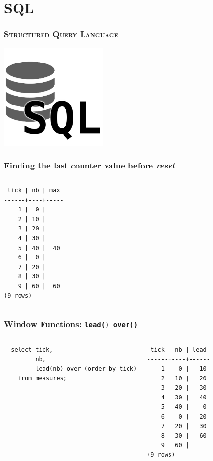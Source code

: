 \documentclass{beamer}
\begin{document}
\section{SQL}

\begin{frame}
  \frametitle{\textsc{Structured Query Language}}

  \begin{center}
    \includegraphics[height=2.1in]{sql.png}
  \end{center}
\end{frame}


\begin{frame}[fragile]
  \frametitle{Finding the last counter value before \textit{reset}}

\begin{columns}
\begin{verbatim}
 tick | nb | max 
------+----+-----
    1 |  0 |    
    2 | 10 |    
    3 | 20 |    
    4 | 30 |    
    5 | 40 |  40
    6 |  0 |    
    7 | 20 |    
    8 | 30 |    
    9 | 60 |  60
(9 rows)
\end{verbatim}
\end{columns}
\end{frame}

\begin{frame}[fragile]
  \frametitle{Window Functions: \texttt{lead() over()}}

\begin{columns}
\begin{verbatim}
  select tick,
         nb,
         lead(nb) over (order by tick)
    from measures;
\end{verbatim}

\begin{verbatim}
 tick | nb | lead 
------+----+------
    1 |  0 |   10
    2 | 10 |   20
    3 | 20 |   30
    4 | 30 |   40
    5 | 40 |    0
    6 |  0 |   20
    7 | 20 |   30
    8 | 30 |   60
    9 | 60 |     
(9 rows)
\end{verbatim}
\end{columns}
\end{frame}
\end{document}

